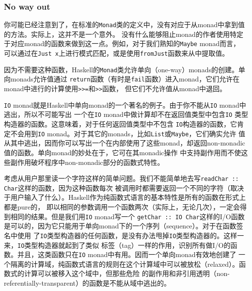 \vspace{-1.2em}
\subsubsection{No way out}
\indent{}你可能已经注意到了，在标准的\texttt{Monad}类的定义中，没有对应于从monad中拿到值的方法。实际上，这并不是一个意外。
没有什么能够阻止monad的作者使用特定于对应monad的函数来做到这一点。例如，对于我们熟知的\texttt{Maybe} monad而言，
可以通过在\texttt{Just x}上进行模式匹配，或是使用\texttt{fromJust}函数来从中提取值。

\indent{}因为不需要这种函数，Haskell的\texttt{Monad}类允许单向（one-way）monads的创建。单向monads允许值通过
\texttt{return}函数（有时是\texttt{fail}函数）进入monad，它们允许在monad中进行的计算使用\texttt{>>=}和\texttt{>>}函数，
但它们不允许值从monad中退回。

\indent{}\texttt{IO} monad就是Haskell中单向monad的一个著名的例子。由于你不能从\texttt{IO} monad中逃出，所以不可能写出
一个在\texttt{IO} monad中做计算却不在返回值类型中包含\texttt{IO} 类型构造器的函数。这意味着，对于任何返回值类型中不包含
\texttt{IO}构造器的函数，它肯定不会用到\texttt{IO} monad。对于其它的monads，比如\texttt{List}或\texttt{Maybe}，它们确实允许
值从其中逃出，因而你可以写出一个在内部使用了这些monad，却返回non-monadic值的函数。单向monad的妙处在于，它可在其monadic操作
中支持副作用而不使这些副作用破坏程序中non-monadic部分的函数式特性。

\indent{}考虑从用户那里读一个字符这样的简单问题。我们不能简单地去写\texttt{readChar :: Char}这样的函数，因为这种函数每次
被调用时都需要返回一个不同的字符（取决于用户输入了什么）。Haskell作为纯函数式语言的基本特性是所有的函数在形式上都是pure的，
即以相同的参数调用一个函数两次（实际上，无论几次），一定会得到相同的结果。但是我们用\texttt{IO} monad写一个
\texttt{getChar :: IO Char}这样的I/O函数是可以的，因为它只能用于单向monad下的一个序列（sequence）。对于在函数签名中使用
了\texttt{IO}类型构造器的任何函数，是没有办法甩掉\texttt{IO}类型构造器的。这样一来，\texttt{IO}类型构造器就起到了类似
标签（tag）一样的作用，识别所有做I/O的函数。并且，这类函数只在\texttt{IO} monad中有用。因而一个单向monad有效地创建了
一个隔离的计算域，纯函数式语言的规则在这个计算域中可以被放松（relaxed）。函数式的计算可以被移入这个域中，但那些危险
的副作用和非引用透明（non-referentially-transparent）的函数是不能从域中逃出的。

\vspace{-0.6em}
